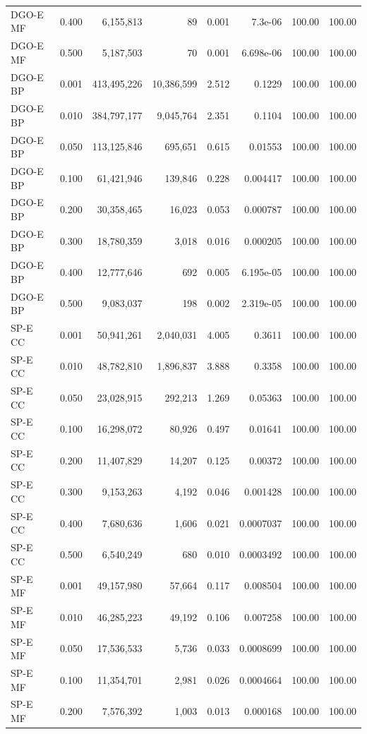 \begin{longtable}{lrrrrrrr}
DGO-E MF & 0.400 & 6,155,813 & 89 & 0.001 & 7.3e-06 & 100.00 & 100.00 \\
DGO-E MF & 0.500 & 5,187,503 & 70 & 0.001 & 6.698e-06 & 100.00 & 100.00 \\
DGO-E BP & 0.001 & 413,495,226 & 10,386,599 & 2.512 & 0.1229 & 100.00 & 100.00 \\
DGO-E BP & 0.010 & 384,797,177 & 9,045,764 & 2.351 & 0.1104 & 100.00 & 100.00 \\
DGO-E BP & 0.050 & 113,125,846 & 695,651 & 0.615 & 0.01553 & 100.00 & 100.00 \\
DGO-E BP & 0.100 & 61,421,946 & 139,846 & 0.228 & 0.004417 & 100.00 & 100.00 \\
DGO-E BP & 0.200 & 30,358,465 & 16,023 & 0.053 & 0.000787 & 100.00 & 100.00 \\
DGO-E BP & 0.300 & 18,780,359 & 3,018 & 0.016 & 0.000205 & 100.00 & 100.00 \\
DGO-E BP & 0.400 & 12,777,646 & 692 & 0.005 & 6.195e-05 & 100.00 & 100.00 \\
DGO-E BP & 0.500 & 9,083,037 & 198 & 0.002 & 2.319e-05 & 100.00 & 100.00 \\
SP-E CC & 0.001 & 50,941,261 & 2,040,031 & 4.005 & 0.3611 & 100.00 & 100.00 \\
SP-E CC & 0.010 & 48,782,810 & 1,896,837 & 3.888 & 0.3358 & 100.00 & 100.00 \\
SP-E CC & 0.050 & 23,028,915 & 292,213 & 1.269 & 0.05363 & 100.00 & 100.00 \\
SP-E CC & 0.100 & 16,298,072 & 80,926 & 0.497 & 0.01641 & 100.00 & 100.00 \\
SP-E CC & 0.200 & 11,407,829 & 14,207 & 0.125 & 0.00372 & 100.00 & 100.00 \\
SP-E CC & 0.300 & 9,153,263 & 4,192 & 0.046 & 0.001428 & 100.00 & 100.00 \\
SP-E CC & 0.400 & 7,680,636 & 1,606 & 0.021 & 0.0007037 & 100.00 & 100.00 \\
SP-E CC & 0.500 & 6,540,249 & 680 & 0.010 & 0.0003492 & 100.00 & 100.00 \\
SP-E MF & 0.001 & 49,157,980 & 57,664 & 0.117 & 0.008504 & 100.00 & 100.00 \\
SP-E MF & 0.010 & 46,285,223 & 49,192 & 0.106 & 0.007258 & 100.00 & 100.00 \\
SP-E MF & 0.050 & 17,536,533 & 5,736 & 0.033 & 0.0008699 & 100.00 & 100.00 \\
SP-E MF & 0.100 & 11,354,701 & 2,981 & 0.026 & 0.0004664 & 100.00 & 100.00 \\
SP-E MF & 0.200 & 7,576,392 & 1,003 & 0.013 & 0.000168 & 100.00 & 100.00 \\

\end{longtable}
